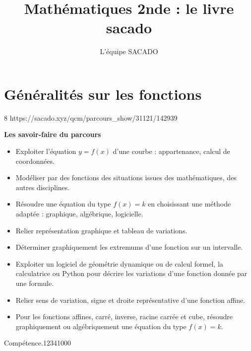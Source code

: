 


\usepackage{tkz-tab}

\title{Mathématiques 2nde  : le livre sacado}
\author{L'équipe SACADO}




\chapter{Généralités sur les fonctions}{8}
{https://sacado.xyz/qcm/parcours_show/31121/142939}
{
 \begin{CpsCol}
	\textbf{Les savoir-faire du parcours}
 	\begin{itemize}
		\item Exploiter l'équation $y = f(x)$ d'une courbe : appartenance, calcul de coordonnées.
		\item  Modéliser par des fonctions des situations issues des mathématiques, des autres disciplines.
		\item Résoudre une équation du type $f(x) = k$ en choisissant une méthode adaptée : graphique, algébrique, logicielle.
		\item Relier représentation graphique et tableau de variations.
		\item Déterminer graphiquement les extremums d'une fonction sur un intervalle.
		\item Exploiter un logiciel de géométrie dynamique ou de calcul formel, la calculatrice ou Python pour décrire
les variations d'une fonction donnée par une formule.
		\item Relier sens de variation, signe et droite représentative d'une fonction affine.
		\item Pour les fonctions affines, carré, inverse, racine carrée et cube, résoudre graphiquement ou algébriquement
une équation du type $f(x) = k$.
 	\end{itemize}
 \end{CpsCol}

\begin{His}
\end{His}

\begin{ExoDec}{Compétence.}{1234}{1}{0}{0}{0}
\end{ExoDec}
}

